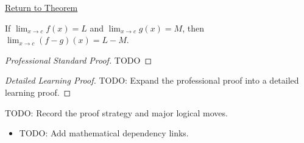 \newpage
{}
\label{prf:difference-rule-function-limits}

\begin{remark*}[Return]
\hyperref[thm:difference-rule-function-limits]{Return to Theorem}
\end{remark*}

\begin{theorem*}
If $\lim_{x\to c}f(x)=L$ and $\lim_{x\to c}g(x)=M$, then $\lim_{x\to c}(f-g)(x)=L-M$.
\end{theorem*}

\begin{proof}[Professional Standard Proof]
\LRAProofBodyStart
TODO
\end{proof}

\begin{proof}[Detailed Learning Proof]
\LRAProofBodyStart
TODO: Expand the professional proof into a detailed learning proof.
\end{proof}

\begin{remark*}
TODO: Record the proof strategy and major logical moves.
\end{remark*}

\begin{dependencies}
\begin{itemize}
  \item TODO: Add mathematical dependency links.
\end{itemize}
\end{dependencies}
